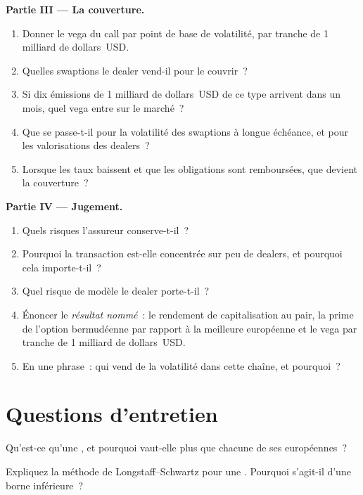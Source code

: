 \begin{problem}
\medskip\noindent\textbf{Partie III --- La couverture.}
\begin{enumerate}[resume]
\item Donner le vega du call par point de base de volatilité, par tranche de 1 milliard de dollars~USD.
\item Quelles swaptions le dealer vend-il pour le couvrir~?
\item Si dix émissions de 1 milliard de dollars~USD de ce type arrivent dans un mois, quel vega entre sur le marché~?
\item Que se passe-t-il pour la volatilité des swaptions à longue échéance, et pour les valorisations des dealers~?
\item Lorsque les taux baissent et que les obligations sont remboursées, que devient la couverture~?
\end{enumerate}

\medskip\noindent\textbf{Partie IV --- Jugement.}
\begin{enumerate}[resume]
\item Quels risques l'assureur conserve-t-il~?
\item Pourquoi la transaction est-elle concentrée sur peu de dealers, et pourquoi cela importe-t-il~?
\item Quel risque de modèle le dealer porte-t-il~?
\item Énoncer le \emph{résultat nommé}~: le rendement de capitalisation au pair, la prime de l'option bermudéenne par rapport
à la meilleure européenne et le vega par tranche de 1 milliard de dollars~USD.
\item En une phrase~: qui vend de la volatilité dans cette chaîne, et pourquoi~?
\end{enumerate}
\end{problem}

\section{Questions d'entretien}

\begin{interviewq}\label{iq:rc:bermudans-and-callables:1}
Qu'est-ce qu'une , et pourquoi vaut-elle plus que chacune de ses européennes~?
\end{interviewq}

\begin{interviewq}\label{iq:rc:bermudans-and-callables:2}
Expliquez la méthode de Longstaff--Schwartz pour une . Pourquoi s'agit-il d'une borne inférieure~?
\end{interviewq}

